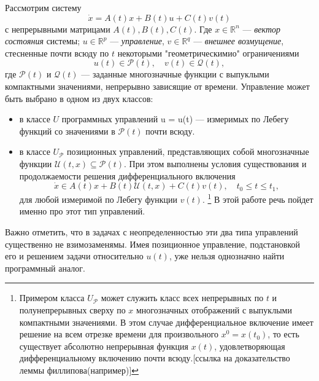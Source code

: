 
Рассмотрим систему
\begin{equation}\label{problem}
    \dot{x} = A(t)x + B(t)u + C(t)v(t)
\end{equation}
с непрерывными матрицами \( A(t), B(t), C(t) \). Где \( x \in \mathbb{R}^n \)
 --- \emph{вектор состояния} системы; \( u \in \mathbb{R}^p \) --- 
 \emph{управление}, \( v \in \mathbb{R}^q \) --- \emph{внешнее возмущение},
 стесненные почти всюду по \( t \) некоторыми "геометрическимио" ограничениями
\[
    u(t) \in \mathcal{P}(t), \quad v(t) \in \mathcal{Q}(t),
\]
 где \( \mathcal{P}(t) \) и \( \mathcal{Q}(t) \) --- заданные многозначные
 функции с выпуклыми компактными значениями, непрерывно зависящие от времени. 
Управление может быть выбрано в одном из двух классов:
\begin{itemize}
    \item в классе \( U \) программных управлений u = u(t) --- измеримых по
     Лебегу функций со значениями в \( \mathcal{P}(t) \) почти всюду.
    \item в классе \( U_\mathcal{P} \) позиционных управлений, представляющих
     собой многозначные функции \( \mathcal{U}(t,x) \subseteq
     \mathcal{P}(t) \). При этом выполнены условия существования и
     продолжаемости решения дифференциального включения
    \begin{equation}\label{dif_inclusion}
        \dot{x} \in A(t)x + B(t)\mathcal{U}(t,x) + C(t)v(t), \quad
         t_0 \le t \le t_1, 
    \end{equation}
    для любой измеримой по Лебегу функции \( v(t) \). \footnote{Примером класса
     \( U_\mathcal{P} \) может служить класс всех непрерывных по \( t \) и
     полунепрерывных сверху по \( x \) многозначных отображений с выпуклыми
     компактными значениями. В этом случае дифференциальное включение имеет
     решение на всем отрезке времени для произвольного \( x^0 = x(t_0) \),
     то есть существует абсолютно непрерывная функция \( x(t) \),
     удовлетворяющая дифференциальному включению почти всюду.[ссылка на
     доказательство леммы филлипова(например)]} В этой работе речь пойдет 
     именно про этот тип управлений.
\end{itemize}
Важно отметить, что в задачах с неопределенностью эти два типа управлений
 существенно не взимозаменямы. Имея позиционное управление, подстановкой его
 и решением задачи относительно \( u(t) \), уже нельзя однозначно найти
 программный аналог.

